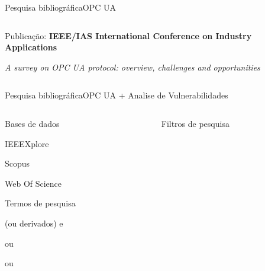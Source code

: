 \documentclass{uspBeamer}
\begin{document}
\begin{frame}{Pesquisa bibliográfica}{OPC UA}
\begin{columns}
\begin{column}{0.6\textwidth}
\begin{wideitemize}
\begin{wideitemize}
                    \end{wideitemize}
                    \item Publicação: \textbf{IEEE/IAS International Conference on Industry Applications}
                    \begin{wideitemize}
                        \item \textit{A survey on OPC UA protocol: overview, challenges and opportunities}
                    \end{wideitemize}
                \end{wideitemize}
            \end{column}
        \end{columns}
    \end{frame}

    \begin{frame}{Pesquisa bibliográfica}{OPC UA + Analise de Vulnerabilidades}
        \begin{columns}
            \begin{column}{0.4\textwidth}
                \begin{wideitemize}
                    \item Bases de dados
                    \begin{wideitemize}
                        \item IEEEXplore
                        \item Scopus
                        \item Web Of Science
                    \end{wideitemize}
                    \item Termos de pesquisa
                    \begin{wideitemize}
                        \item {} (ou derivados) e
                        \item {} ou
                        \item {} ou
                        \item {}
                    \end{wideitemize}
                \end{wideitemize}
            \end{column}
            \begin{column}{0.6\textwidth}
                \begin{wideitemize}
                    \item Filtros de pesquisa

\end{wideitemize}
\end{column}
\end{columns}
\end{frame}
\end{document}

